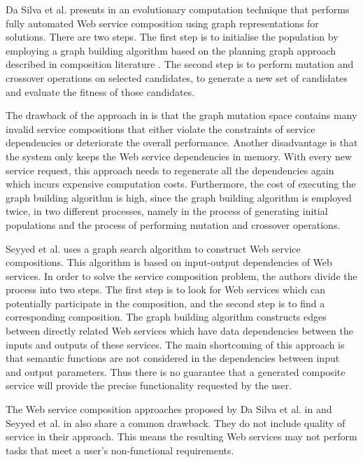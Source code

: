 Da Silva et al. presents in \cite{2} an evolutionary computation technique that performs fully automated Web service composition using graph representations for solutions. There are two steps. The first step is to initialise the population by employing a graph building algorithm based on the planning graph approach described in composition literature \cite{3}. The second step is to perform mutation and crossover operations on selected candidates, to generate a new set of candidates and evaluate the fitness of those candidates.\par
The drawback of the approach in \cite{2} is that the graph mutation space contains many invalid service compositions that either violate the constraints of service dependencies or deteriorate the overall performance. Another disadvantage is that the system only keeps the Web service dependencies in memory. With every new service request, this approach needs to regenerate all the dependencies again which incurs expensive computation costs. Furthermore, the cost of executing the graph building algorithm is high, since the graph building algorithm is employed twice, in two different processes, namely in the process of generating initial populations and the process of performing mutation and crossover operations.\par
Seyyed et al. \cite{5} uses a graph search algorithm to construct Web service compositions. This algorithm is based on input-output dependencies of Web services. In order to solve the service composition problem, the authors divide the process into two steps. The first step is to look for Web services which can potentially participate in the composition, and the second step is to find a corresponding composition. The graph building algorithm constructs edges between directly related Web services which have data dependencies between the inputs and outputs of these services. The main shortcoming of this approach is that semantic functions are not considered in the dependencies between input and output parameters. Thus there is no guarantee that a generated composite service will provide the precise functionality requested by the user.\par
The Web service composition approaches proposed by Da Silva et al. in \cite{2} and Seyyed et al. in \cite{5} also share a common drawback. They do not include quality of service in their approach. This means the resulting Web services may not perform tasks that meet a user's non-functional requirements.\par

